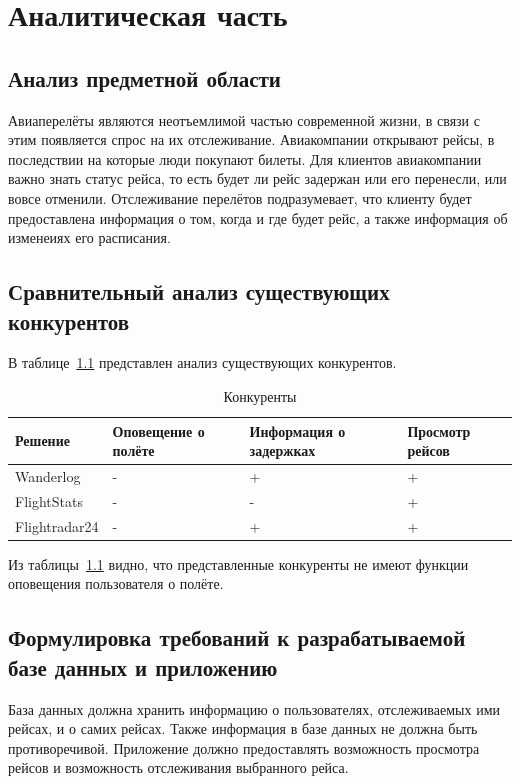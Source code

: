 \chapter{Аналитическая часть}

\section{Анализ предметной области}
Авиаперелёты являются неотъемлимой частью современной жизни, в связи с этим появляется спрос на их отслеживание. Авиакомпании открывают рейсы, в последствии на которые люди покупают билеты. Для клиентов авиакомпании важно знать статус рейса, то есть будет ли рейс задержан или его перенесли, или вовсе отменили. Отслеживание перелётов подразумевает, что клиенту будет предоставлена информация о том, когда и где будет рейс, а также информация об изменеиях его расписания.

\section{Сравнительный анализ существующих конкурентов}
В таблице~\ref{table:competitors} представлен анализ существующих конкурентов.
\begin{table}[H]
	\caption{Конкуренты}
	\begin{tabularx}{\textwidth}{
			| >{\centering\arraybackslash}X
			| >{\centering\arraybackslash}X
			| >{\centering\arraybackslash}X
			| >{\centering\arraybackslash}X |
		}
		\hline
		Решение & Оповещение о полёте & Информация о задержках & Просмотр рейсов\\
		\hline
		Wanderlog & - & + & +\\
		\hline
		FlightStats & - & - & +\\
		\hline
		Flightradar24 & - & + & +\\
		\hline
	\end{tabularx}
	\label{table:competitors}
\end{table}

Из таблицы~\ref{table:competitors} видно, что представленные конкуренты не имеют функции оповещения пользователя о полёте.

\section{Формулировка требований к разрабатываемой базе данных и приложению}
База данных должна хранить информацию о пользователях, отслеживаемых ими рейсах, и о самих рейсах. Также информация в базе данных не должна быть противоречивой. Приложение должно предоставлять возможность просмотра рейсов и возможность отслеживания выбранного рейса.

